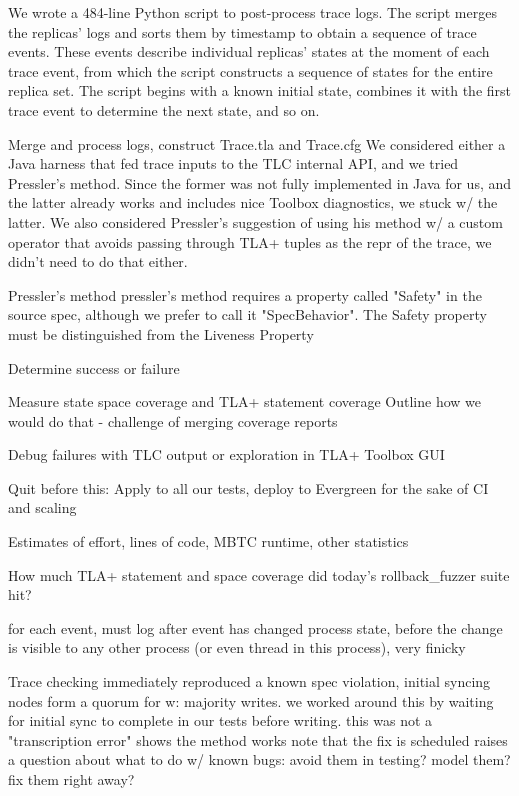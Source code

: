 \documentclass{vldb}
\begin{document}
We wrote a 484-line Python script to post-process trace logs. The script merges the replicas' logs and sorts them by timestamp to obtain a sequence of trace events. These events describe individual replicas' states at the moment of each trace event, from which the script constructs a sequence of states for the entire replica set. The script begins with a known initial state, combines it with the first trace event to determine the next state, and so on.


Merge and process logs, construct Trace.tla and Trace.cfg
We considered either a Java harness that fed trace inputs to the TLC internal API, and we tried Pressler's method. Since the former was not fully implemented in Java for us, and the latter already works and includes nice Toolbox diagnostics, we stuck w/ the latter. We also considered Pressler's suggestion of using his method w/ a custom operator that avoids passing through TLA+ tuples as the repr of the trace, we didn't need to do that either.

Pressler's method
pressler's method requires a property called "Safety" in the source spec, although we prefer to call it "SpecBehavior". The Safety property must be distinguished from the Liveness Property

Determine success or failure

Measure state space coverage and TLA+ statement coverage
Outline how we would do that - challenge of merging coverage reports

Debug failures with TLC output or exploration in TLA+ Toolbox GUI

Quit before this: Apply to all our tests, deploy to Evergreen for the sake of CI and scaling

Estimates of effort, lines of code, MBTC runtime, other statistics

How much TLA+ statement and space coverage did today's rollback_fuzzer suite hit?

for each event, must log after event has changed process state, before the change is visible to any other process (or even thread in this process), very finicky


Trace checking immediately reproduced a known spec violation, initial syncing nodes form a quorum for w: majority writes. we worked around this by waiting for initial sync to complete in our tests before writing. this was not a "transcription error"
shows the method works
note that the fix is scheduled
raises a question about what to do w/ known bugs: avoid them in testing? model them? fix them right away?
\end{document}
